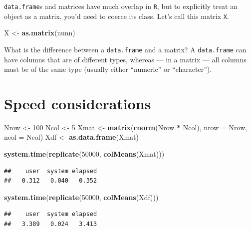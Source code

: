 \documentclass[]{book}
\newenvironment{Shaded}{\begin{snugshade}}{\end{snugshade}}
\newcommand{\KeywordTok}[1]{\textcolor[rgb]{0.13,0.29,0.53}{\textbf{#1}}}
\newcommand{\DataTypeTok}[1]{\textcolor[rgb]{0.13,0.29,0.53}{#1}}
\newcommand{\DecValTok}[1]{\textcolor[rgb]{0.00,0.00,0.81}{#1}}
\newcommand{\StringTok}[1]{\textcolor[rgb]{0.31,0.60,0.02}{#1}}
\newcommand{\OperatorTok}[1]{\textcolor[rgb]{0.81,0.36,0.00}{\textbf{#1}}}
\newcommand{\NormalTok}[1]{#1}
\theoremstyle{definition}
\theoremstyle{definition}
\theoremstyle{definition}
\theoremstyle{remark}
\begin{document}
\texttt{data.frame}s and matrices have much overlap in \texttt{R}, but
to explicitly treat an object as a matrix, you'd need to coerce its
class. Let's call this matrix \texttt{X}.

\begin{Shaded}
\begin{Highlighting}[]
\NormalTok{X <-}\StringTok{ }\KeywordTok{as.matrix}\NormalTok{(nunn)}
\end{Highlighting}
\end{Shaded}

What is the difference between a \texttt{data.frame} and a matrix? A
\texttt{data.frame} can have columns that are of different types,
whereas --- in a matrix --- all columns must be of the same type
(usually either ``numeric'' or ``character'').

\section{Speed considerations}\label{speed-considerations}

\begin{Shaded}
\begin{Highlighting}[]
\NormalTok{Nrow <-}\StringTok{ }\DecValTok{100}
\NormalTok{Ncol <-}\StringTok{ }\DecValTok{5}
\NormalTok{Xmat <-}\StringTok{ }\KeywordTok{matrix}\NormalTok{(}\KeywordTok{rnorm}\NormalTok{(Nrow }\OperatorTok{*}\StringTok{ }\NormalTok{Ncol), }\DataTypeTok{nrow =}\NormalTok{ Nrow, }\DataTypeTok{ncol =}\NormalTok{ Ncol)}
\NormalTok{Xdf <-}\StringTok{ }\KeywordTok{as.data.frame}\NormalTok{(Xmat)}

\KeywordTok{system.time}\NormalTok{(}\KeywordTok{replicate}\NormalTok{(}\DecValTok{50000}\NormalTok{, }\KeywordTok{colMeans}\NormalTok{(Xmat)))}
\end{Highlighting}
\end{Shaded}

\begin{verbatim}
##    user  system elapsed 
##   0.312   0.040   0.352
\end{verbatim}

\begin{Shaded}
\begin{Highlighting}[]
\KeywordTok{system.time}\NormalTok{(}\KeywordTok{replicate}\NormalTok{(}\DecValTok{50000}\NormalTok{, }\KeywordTok{colMeans}\NormalTok{(Xdf)))}
\end{Highlighting}
\end{Shaded}

\begin{verbatim}
##    user  system elapsed 
##   3.389   0.024   3.413
\end{verbatim}
\end{document}
